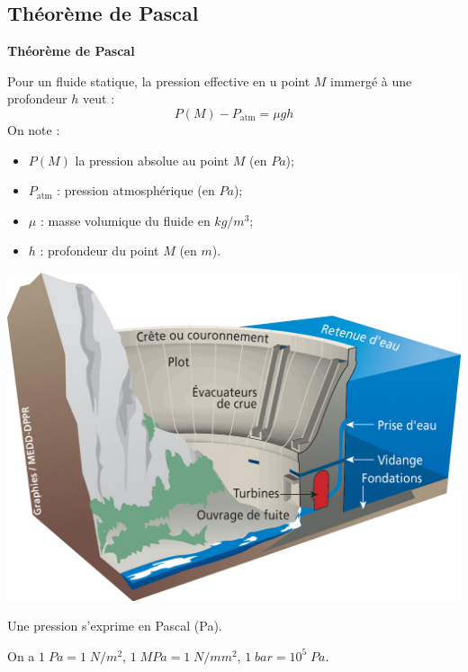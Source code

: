 \documentclass[10pt]{article}
\begin{document}
\subsection{Théorème de Pascal}
\begin{theo}
\begin{minipage}[c]{.5\linewidth}
\textbf{Théorème de Pascal}

Pour un fluide statique, la pression effective en u point $M$ immergé à une profondeur $h$ veut : 
$$
P(M) - P_{\text{atm}} = \mu g h
$$
On note :
\begin{itemize}
\item $P(M)$ la pression absolue au point $M$ (en $Pa$);
\item $P_{\text{atm}}$ : pression atmosphérique (en $Pa$);
\item $\mu$ : masse volumique du fluide en $kg/m^3$;
\item $h$ : profondeur du point $M$ (en $m$).
\end{itemize}
\end{minipage}\hfill
\begin{minipage}[c]{.4\linewidth}
\begin{center}
\includegraphics[width=\textwidth]{images/barrage}
\end{center}
\end{minipage}
\end{theo}

\begin{rem}
Une pression s'exprime en Pascal (Pa). 

On a  $1\; Pa = 1\; N/m^2$, $1\; MPa = 1\; N/mm^2$, $1\; bar = 10^5 \; Pa$.
\end{rem}
\end{document}
